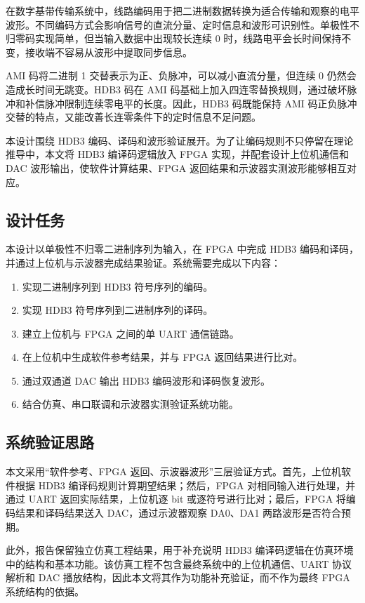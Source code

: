 \documentclass[UTF8,a4paper,12pt]{ctexart}
\begin{document}
在数字基带传输系统中，线路编码用于把二进制数据转换为适合传输和观察的电平波形。不同编码方式会影响信号的直流分量、定时信息和波形可识别性。单极性不归零码实现简单，但当输入数据中出现较长连续 0 时，线路电平会长时间保持不变，接收端不容易从波形中提取同步信息。

AMI 码将二进制 1 交替表示为正、负脉冲，可以减小直流分量，但连续 0 仍然会造成长时间无跳变。HDB3 码在 AMI 码基础上加入四连零替换规则，通过破坏脉冲和补信脉冲限制连续零电平的长度。因此，HDB3 码既能保持 AMI 码正负脉冲交替的特点，又能改善长连零条件下的定时信息不足问题。

本设计围绕 HDB3 编码、译码和波形验证展开。为了让编码规则不只停留在理论推导中，本文将 HDB3 编译码逻辑放入 FPGA 实现，并配套设计上位机通信和 DAC 波形输出，使软件计算结果、FPGA 返回结果和示波器实测波形能够相互对应。

\newpage
\subsection{设计任务}

本设计以单极性不归零二进制序列为输入，在 FPGA 中完成 HDB3 编码和译码，并通过上位机与示波器完成结果验证。系统需要完成以下内容：

\begin{enumerate}
  \item 实现二进制序列到 HDB3 符号序列的编码。
  \item 实现 HDB3 符号序列到二进制序列的译码。
  \item 建立上位机与 FPGA 之间的单 UART 通信链路。
  \item 在上位机中生成软件参考结果，并与 FPGA 返回结果进行比对。
  \item 通过双通道 DAC 输出 HDB3 编码波形和译码恢复波形。
  \item 结合仿真、串口联调和示波器实测验证系统功能。
\end{enumerate}

\subsection{系统验证思路}

本文采用“软件参考、FPGA 返回、示波器波形”三层验证方式。首先，上位机软件根据 HDB3 编译码规则计算期望结果；然后，FPGA 对相同输入进行处理，并通过 UART 返回实际结果，上位机逐 bit 或逐符号进行比对；最后，FPGA 将编码结果和译码结果送入 DAC，通过示波器观察 DA0、DA1 两路波形是否符合预期。

此外，报告保留独立仿真工程结果，用于补充说明 HDB3 编译码逻辑在仿真环境中的结构和基本功能。该仿真工程不包含最终系统中的上位机通信、UART 协议解析和 DAC 播放结构，因此本文将其作为功能补充验证，而不作为最终 FPGA 系统结构的依据。
\end{document}
